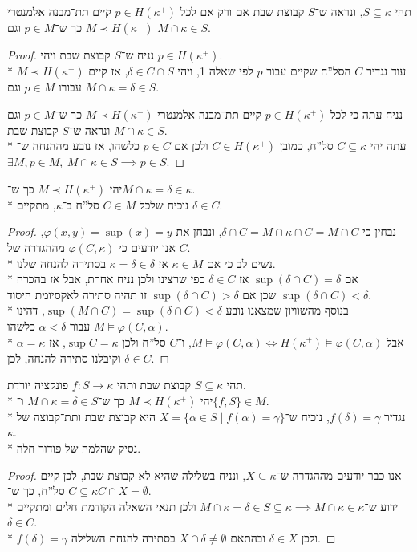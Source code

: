 \question{}
תהי $S \subseteq \kappa$, ונראה ש־$S$ קבוצת שבת אם ורק אם לכל $p \in H(\kappa^+)$ קיים תת־מבנה אלמנטרי $M \prec H(\kappa^+)$ כך ש־$p \in M$ וגם $M \cap \kappa \in S$.
\begin{proof}
	נניח ש־$S$ קבוצת שבת ויהי $p \in H(\kappa^+)$. \\*
	עוד נגדיר $C$ הסל''ח שקיים עבור $p$ לפי שאלה 1, ויהי $\delta \in C \cap S$, אז קיים $M \prec H(\kappa^+)$ עבורו $p \in M$ וגם $M \cap \kappa = \delta \in S$.

	נניח עתה כי לכל $p \in H(\kappa^+)$ קיים תת־מבנה אלמנטרי $M \prec H(\kappa^+)$ כך ש־$p \in M$ וגם $M \cap \kappa \in S$ ונראה ש־$S$ קבוצת שבת. \\*
	עתה יהי $C \subseteq \kappa$ סל''ח, כמובן $C \in H(\kappa^+)$ ולכן אם $p \in C$ כלשהו, אז נובע מההנחה ש־$\exists M, p \in M,\ M \cap \kappa \in S \implies p \in S$.
\end{proof}

\question{}
יהי $M \prec H(\kappa^+)$ כך ש־$M \cap \kappa = \delta \in \kappa$. \\*
נוכיח שלכל $C \in M$ סל''ח ב־$\kappa$, מתקיים $\delta \in C$.
\begin{proof}
	נבחין כי $\delta \cap C = M \cap \kappa \cap C = M \cap C$, ונבחן את $\varphi(x, y) = \sup(x) = y$, אנו יודעים כי $\varphi(C, \kappa)$ מההגדרה של $C$. \\*
	נשים לב כי אם $\kappa \in M$ אז $\kappa = \delta \in \delta$ בסתירה להנחה שלנו. \\*
	אם $\sup(\delta \cap C) = \delta$ אז $\delta \in C$ כפי שרצינו ולכן נניח אחרת,
	אבל אז בהכרח $\sup(\delta \cap C) < \delta$ שכן אם $\sup(\delta \cap C) > \delta$ זו תהיה סתירה לאקסיומת היסוד. \\*
	בנוסף מהשוויון שמצאנו נובע $\sup(M \cap C) = \sup(\delta \cap C) < \delta$, דהינו $M \models \varphi(C, \alpha)$ עבור $\alpha < \delta$ כלשהו. \\*
	אבל $M \models \varphi(C, \alpha) \iff H(\kappa^+) \models \varphi(C, \alpha)$, ו־$C$ סל''ח ולכן $\sup C = \kappa$, אז $\alpha = \kappa$ וקיבלנו סתירה להנחה, לכן $\delta \in C$.
\end{proof}

\question{}
תהי $S \subseteq \kappa$ קבוצת שבת ותהי $f : S \to \kappa$ פונקציה יורדת. \\*
יהי $M \prec H(\kappa^+)$ כך ש־$M \cap \kappa = \delta \in S$ ו־$\{f, S\} \in M$. \\*
נגדיר $f(\delta) = \gamma$, נוכיח ש־$X = \{ \alpha \in S \mid f(\alpha) = \gamma \}$ היא קבוצת שבת ותת־קבוצה של $\kappa$. \\*
נסיק שהלמה של פודור חלה.
\begin{proof}
	אנו כבר יודעים מההגדרה ש־$X \subseteq \kappa$, ונניח בשלילה שהיא לא קבוצת שבת, לכן קיים $C \subseteq \kappa$ סל''ח, כך ש־$C \cap X = \emptyset$. \\*
	ידוע ש־$M \cap \kappa = \delta \in S \subseteq \kappa \implies M \cap \kappa \in \kappa$ ולכן תנאי השאלה הקודמת חלים ומתקיים $\delta \in C$. \\*
	$f(\delta) = \gamma$ ולכן $\delta \in X$ ובהתאם $X \cap \delta \ne \emptyset$ בסתירה להנחת השלילה.
\end{proof}


